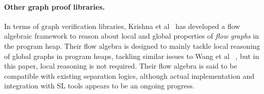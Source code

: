 \paragraph{Other graph proof libraries.} In terms of graph verification libraries, Krishna et al~\cite{DBLP:conf/esop/KrishnaSW20} has developed a flow algebraic framework to reason about local and global properties of \textit{flow graphs} in the program heap. Their flow algebra is designed to mainly tackle local reasoning of global graphs in program heaps, tackling similar issues to Wang et al ~\cite{DBLP:journals/pacmpl/WangCMH19}, but in this paper, local reasoning is not required. Their flow algebra is said to be compatible with existing separation logics, although actual implementation and integration with SL tools appears to be an ongoing progress.



